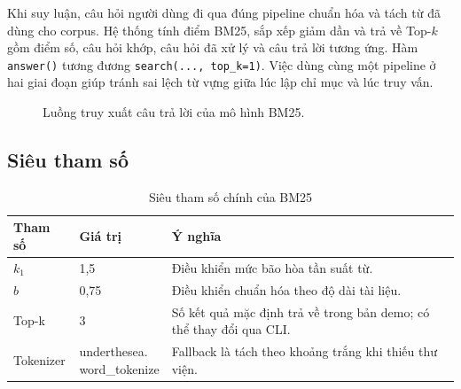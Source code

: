 \documentclass[12pt,a4paper,oneside]{report}
\begin{document}
Khi suy luận, câu hỏi người dùng đi qua đúng pipeline chuẩn hóa và tách từ đã dùng cho corpus. Hệ thống tính điểm BM25, sắp xếp giảm dần và trả về Top-$k$ gồm điểm số, câu hỏi khớp, câu hỏi đã xử lý và câu trả lời tương ứng. Hàm \texttt{answer()} tương đương \texttt{search(..., top\_k=1)}. Việc dùng cùng một pipeline ở hai giai đoạn giúp tránh sai lệch từ vựng giữa lúc lập chỉ mục và lúc truy vấn.

\begin{figure}[H]
    \centering
    \caption{Luồng truy xuất câu trả lời của mô hình BM25.}
    \label{fig:bm25-retrieval-flow}
\end{figure}

\subsection{Siêu tham số}
\begin{table}[H]
\centering
\caption{Siêu tham số chính của BM25}
\label{tab:bm25-hyperparams}
\begin{tabularx}{\textwidth}{p{3cm}p{3cm}Y}
\toprule
\textbf{Tham số} & \textbf{Giá trị} & \textbf{Ý nghĩa}\\
\midrule
$k_1$ & 1,5 & Điều khiển mức bão hòa tần suất từ.\\
$b$ & 0,75 & Điều khiển chuẩn hóa theo độ dài tài liệu.\\
Top-k & 3 & Số kết quả mặc định trả về trong bản demo; có thể thay đổi qua CLI.\\
Tokenizer & {\footnotesize\ttfamily underthesea.\newline word\_tokenize} & Fallback là tách theo khoảng trắng khi thiếu thư viện.\\
\bottomrule
\end{tabularx}
\end{table}
\end{document}
